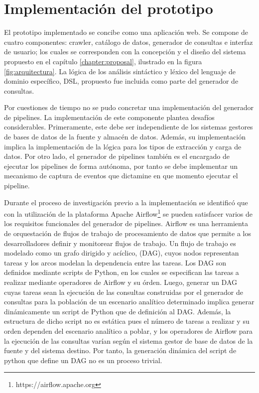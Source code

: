 \section{Implementación del prototipo}\label{section:prototype}

El prototipo implementado se concibe como una aplicación web. Se compone de cuatro componentes: crawler, catálogo de datos, generador de consultas 
e interfaz de usuario; los cuales se corresponden con la concepción y el diseño del sistema propuesto en el capítulo \ref{chapter:proposal}, 
ilustrado en la figura \ref{fig:arquitectura}. 
La lógica de los análisis sintáctico y léxico del lenguaje de dominio específico, DSL, propuesto fue incluida como parte 
del generador de consultas. 

Por cuestiones de tiempo no se pudo concretar una implementación del generador de pipelines. 
La implementación de este componente plantea desafíos considerables. Primeramente, 
este debe ser independiente de los sistemas gestores de bases de datos de la fuente y almacén de datos. 
Además, su implementación implica la implementación de la lógica para los tipos de extracción y carga de datos. 
Por otro lado, el generador de pipelines también es el encargado de ejecutar los pipelines de forma autónoma, 
por tanto se debe implementar un mecanismo de captura de eventos que dictamine en que momento ejecutar el pipeline.

Durante el proceso de investigación previo a la implementación se identificó que con la utilización de la  
plataforma Apache Airflow\footnote{https://airflow.apache.org} se pueden satisfacer varios de los 
requisitos funcionales del generador de pipelines. Airflow es una herramienta de orquestación de flujos de 
trabajo de procesamiento de datos que permite a los desarrolladores definir y monitorear flujos de trabajo. 
Un flujo de trabajo es modelado como un grafo dirigido y ac\'iclico, (DAG), cuyos nodos representan tareas y los 
arcos modelan la dependencia entre las tareas. Los DAG son definidos mediante scripts de Python, en los cuales 
se especifican las tareas a realizar mediante operadores de Airflow y su \'orden. Luego, generar un DAG 
cuyas tareas sean la ejecución de las consultas construidas por el generador de consultas para la población de 
un escenario analítico determinado implica generar 
din\'amicamente un script de Python que de definición al DAG. Además, la estructura de dicho script 
no es estática pues el n\'umero de tareas a realizar y su orden dependen del escenario analítico a poblar,
y los operadores de Airflow para la ejecución de las consultas varían según el sistema gestor de base de 
datos de la fuente y del sistema destino. Por tanto, la generación dinámica del script de python que define un DAG 
no es un proceso trivial.

